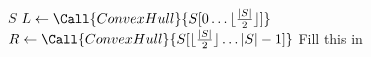 \begin{algorithm}
	\caption{Convex Hull}
	\label{alg:convex_hull}
	\begin{algorithmic}
		\State \Return $S$
		\Else
		\State $L \gets \Call{ConvexHull}{S[0 \dots \lfloor \frac{|S|}{2} \rfloor]}$
		\State $R \gets \Call{ConvexHull}{S[\lfloor \frac{|S|}{2} \rfloor \dots |S|-1]}$
		\State \Return {}
		\EndIf
		\EndFunction
		\State Fill this in
		\EndFunction
	\end{algorithmic}
\end{algorithm}

